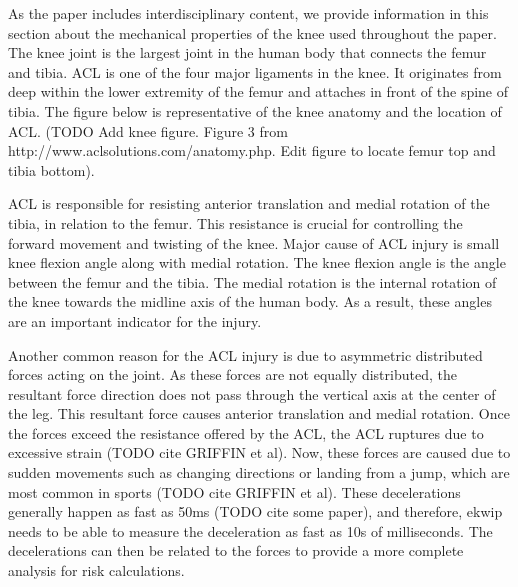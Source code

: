 As the paper includes interdisciplinary content, we provide information in this section about the mechanical properties of the knee used throughout the paper. The knee joint is the largest joint in the human body that connects the femur and tibia. ACL is one of the four major ligaments in the knee. It originates from deep within the lower extremity of the femur and attaches in front of the spine of tibia. The figure below is representative of the knee anatomy and the location of ACL. 
(TODO Add knee figure. Figure 3 from http://www.aclsolutions.com/anatomy.php. Edit figure to locate femur top and tibia bottom).

ACL is responsible for resisting anterior translation and medial rotation of the tibia, in relation to the femur. This resistance is crucial for controlling the forward movement and twisting of the knee. Major cause of ACL injury is small knee flexion angle along with medial rotation. The knee flexion angle is the angle between the femur and the tibia. The medial rotation is the internal rotation of the knee towards the midline axis of the human body. As a result, these angles are an important indicator for the injury.

Another common reason for the ACL injury is due to asymmetric distributed forces acting on the joint. As these forces are not equally distributed, the resultant force direction does not pass through the vertical axis at the center of the leg. This resultant force causes anterior translation and medial rotation. Once the forces exceed the resistance offered by the ACL,  the ACL ruptures due to excessive strain (TODO cite GRIFFIN et al). Now, these forces are caused due to sudden movements such as changing directions or landing from a jump, which are most common in sports (TODO cite GRIFFIN et al). These decelerations generally happen as fast as 50ms (TODO cite some paper), and therefore, ekwip needs to be able to measure the deceleration as fast as 10s of milliseconds. The decelerations can then be related to the forces to provide a more complete analysis for risk calculations.